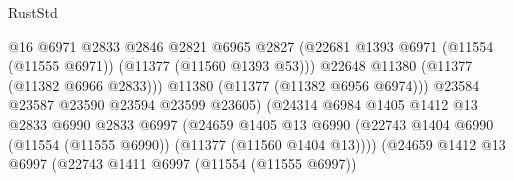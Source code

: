 \begin{lexlean}{RustStd}
\begin{coremodule}
                                              @16
                                              @6971
                                              @2833
                                              @2846
                                              @2821
                                              @6965
                                              @2827
                                              (@22681
                                                @1393
                                                @6971
                                                (@11554 (@11555 @6971))
                                                (@11377 (@11560 @1393 @53)))
                                              @22648
                                              @11380
                                              (@11377 (@11382 @6966 @2833)))
                                            @11380
                                            (@11377 (@11382 @6956 @6974)))
                                          @23584
                                          @23587
                                          @23590
                                          @23594
                                          @23599
                                          @23605)
                                        (@24314
                                          @6984
                                          @1405
                                          @1412
                                          @13
                                          @2833
                                          @6990
                                          @2833
                                          @6997
                                          (@24659
                                            @1405
                                            @13
                                            @6990
                                            (@22743
                                              @1404
                                              @6990
                                              (@11554 (@11555 @6990))
                                              (@11377 (@11560 @1404 @13))))
                                          (@24659
                                            @1412
                                            @13
                                            @6997
                                            (@22743
                                              @1411
                                              @6997
                                              (@11554 (@11555 @6997))

\end{coremodule}
\end{lexlean}
